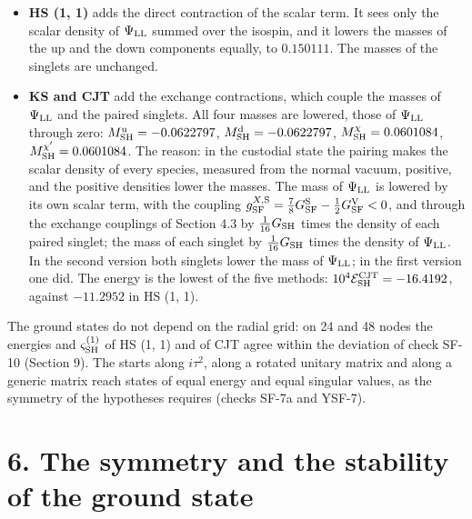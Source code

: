 \documentclass[
  10pt,
]{article}
\begin{document}
\begin{itemize}
  The computed \(\lvert D^{\rm d}_{\rm SH}\rvert=0.812846\) satisfies
  it, with \(M^{\rm eff}_{\rm SH}=0.452967\) (checks YSF-12 and WSF-5).
\item
  \textbf{HS (1, 1)} adds the direct contraction of the scalar term. It
  sees only the scalar density of \(\Psi_{\rm LL}\) summed over the
  isospin, and it lowers the masses of the up and the down components
  equally, to \(0.150111\). The masses of the singlets are unchanged.
\item
  \textbf{KS and CJT} add the exchange contractions, which couple the
  masses of \(\Psi_{\rm LL}\) and the paired singlets. All four masses
  are lowered, those of \(\Psi_{\rm LL}\) through zero:
  \(M^{\rm u}_{\rm SH}=-0.0622797\), \(M^{\rm d}_{\rm SH}=-0.0622797\),
  \(M^\chi_{\rm SH}=0.0601084\), \(M^{\chi'}_{\rm SH}=0.0601084\). The
  reason: in the custodial state the pairing makes the scalar density of
  every species, measured from the normal vacuum, positive, and the
  positive densities lower the masses. The mass of \(\Psi_{\rm LL}\) is
  lowered by its own scalar term, with the coupling
  \(g^{X,{\rm S}}_{\rm SF}=\tfrac78G^{\rm S}_{\rm SF}-\tfrac12G^{\rm V}_{\rm SF}<0\),
  and through the exchange couplings of Section 4.3 by
  \(\tfrac1{16}G_{\rm SH}\) times the density of each paired singlet;
  the mass of each singlet by \(\tfrac1{16}G_{\rm SH}\) times the
  density of \(\Psi_{\rm LL}\). In the second version both singlets
  lower the mass of \(\Psi_{\rm LL}\); in the first version one did. The
  energy is the lowest of the five methods:
  \(10^4\mathcal E^{\rm CJT}_{\rm SH}=-16.4192\), against \(-11.2952\)
  in HS (1, 1).
\end{itemize}

The ground states do not depend on the radial grid: on 24 and 48 nodes
the energies and \(\varsigma^{(1)}_{\rm SH}\) of HS (1, 1) and of CJT
agree within the deviation of check SF-10 (Section 9). The starts along
\(i\tau^2\), along a rotated unitary matrix and along a generic matrix
reach states of equal energy and equal singular values, as the symmetry
of the hypotheses requires (checks SF-7a and YSF-7).

\hypertarget{the-symmetry-and-the-stability-of-the-ground-state}{%
\section{6. The symmetry and the stability of the ground
state}\label{the-symmetry-and-the-stability-of-the-ground-state}}
\end{document}
